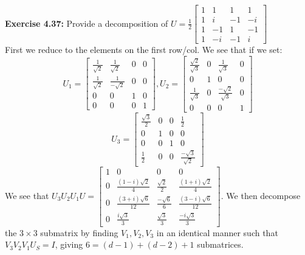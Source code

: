 \documentclass{article}
\begin{document}
	\begin{tcolorbox}\textbf{Exercise 4.37:}
		Provide a decomposition of $U = \frac12 \begin{bmatrix} 1 & 1 & 1 & 1 \\ 1 & i & -1 & -i \\1 & -1 & 1 & -1 \\ 1 & -i & -1 & i\end{bmatrix}$\\
		First we reduce to the elements on the first row/col. We see that if we set:
		$$U_1 = \begin{bmatrix} \frac{1}{\sqrt2} & \frac{1}{\sqrt2} & 0 & 0 \\ \frac{1}{\sqrt2} & \frac{1}{-\sqrt2} & 0 & 0 \\ 0 & 0 & 1 & 0 \\ 0 & 0 & 0 & 1 \end{bmatrix}, U_2 = \begin{bmatrix} \frac{\sqrt2}{\sqrt3} & 0 & \frac{1}{\sqrt3} & 0  \\ 0 & 1 & 0 & 0 \\\frac{1}{\sqrt3} & 0 &  \frac{-\sqrt2}{\sqrt3} & 0 \\ 0 & 0 & 0 & 1 \end{bmatrix}$$
		$$U_3 = \begin{bmatrix} \frac{\sqrt3}{2} & 0 & 0 & \frac12 \\ 0 & 1 & 0 & 0 \\ 0 & 0 & 1 & 0 \\ \frac12 & 0 & 0 & \frac{-\sqrt3}{\sqrt2}\end{bmatrix}$$
		We see that $U_3 U_2 U_1 U = \begin{bmatrix} 1 & 0 & 0 & 0 \\ 0 & \frac{(1-i)\sqrt2}{4} & \frac{\sqrt2}{2} & \frac{(1+i)\sqrt2}{4} \\ 0 & \frac{(3+i)\sqrt6}{12} & \frac{-\sqrt6}{6} & \frac{(3-i)\sqrt6}{12} \\ 0 & \frac{i \sqrt3}{3} & \frac{\sqrt3}{3} & \frac{-i\sqrt3}{3}\end{bmatrix}$.
		We then decompose the $3\times3$ submatrix by finding $V_{1}, V_{2}, V_{3}$ in an identical manner such that $ V_3 V_2 V_1 U_S= I$, giving $6 =(d-1) + (d-2) + 1$ submatrices.  
\end{tcolorbox}
\end{document}
